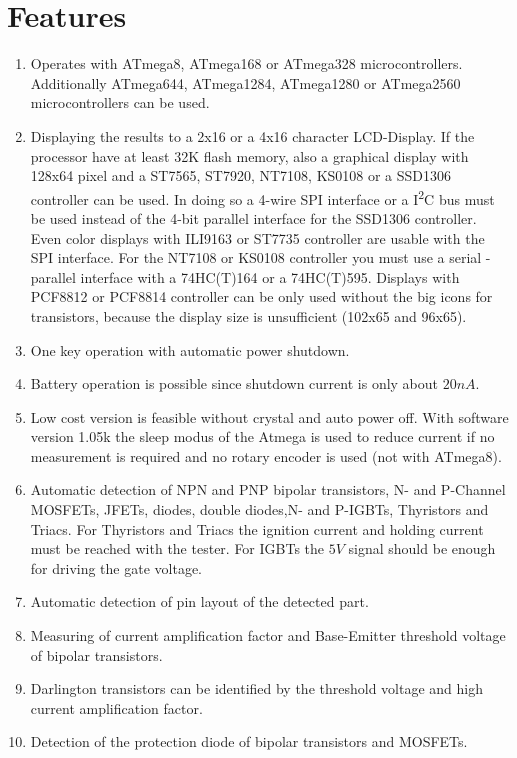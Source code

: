 \chapter{Features}
\label{sec:features}
\begin{enumerate} \setlength{\itemsep}{0pt}
\item Operates with ATmega8, ATmega168 or ATmega328 microcontrollers. Additionally ATmega644, ATmega1284,
ATmega1280 or ATmega2560 microcontrollers can be used.
\item Displaying the results to a 2x16 or a 4x16 character LCD-Display.
 If the processor have at least 32K flash memory, also a graphical display with 128x64 pixel and
a ST7565, ST7920, NT7108, KS0108 or a SSD1306 controller can be used.
In doing so a 4-wire SPI interface or a I\textsuperscript{2}C bus must be used instead of the 4-bit parallel interface for
the SSD1306 controller.
Even color displays with ILI9163 or ST7735 controller are usable with the SPI interface.
For the NT7108 or KS0108 controller you must use a serial - parallel interface with a 74HC(T)164 or a 74HC(T)595.
Displays with PCF8812 or PCF8814 controller can be only used without the big icons for transistors, because the display size is
unsufficient (102x65 and 96x65).
\item One key operation with automatic power shutdown.
\item Battery operation is possible since shutdown current is only about \(20nA\).
\item Low cost version is feasible without crystal and auto power off.
With software version 1.05k the sleep modus of the Atmega is used to reduce current if
no measurement is required and no rotary encoder is used (not with ATmega8).
\item Automatic detection of NPN and PNP bipolar transistors, N- and P-Channel MOSFETs, JFETs,
diodes, double diodes,N- and P-IGBTs, Thyristors and Triacs.
For Thyristors and Triacs the ignition current and holding current must be reached with the tester.
For IGBTs the \(5V\) signal should be enough for driving the gate voltage.
\item Automatic detection of pin layout of the detected part.
\item Measuring of current amplification factor and Base-Emitter threshold voltage of bipolar transistors.
\item Darlington transistors can be identified by the threshold voltage and high current amplification factor.
\item Detection of the protection diode of bipolar transistors and MOSFETs.

\end{enumerate}
